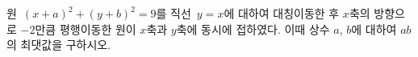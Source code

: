 원~$(x+a)^2+(y+b)^2=9$를 직선~$y=x$에 대하여 대칭이동한 후 $x$축의 방향으로 $-2$만큼 평행이동한 원이 $x$축과 $y$축에 동시에 접하였다. 이때 상수 $a$, $b$에 대하여 $ab$의 최댓값을 구하시오.
